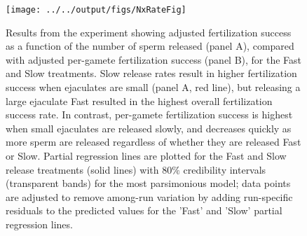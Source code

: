 \documentclass{article}
\begin{document}
\begin{figure}[!ht] 
\centering
\texttt{[image: ../../output/figs/NxRateFig]}
\caption{Results from the  experiment showing adjusted fertilization success as a function of the number of sperm released (panel A), compared with adjusted per-gamete fertilization success (panel B), for the Fast and Slow treatments. Slow release rates result in higher fertilization success when ejaculates are small (panel A, red line), but releasing a large ejaculate Fast resulted in the highest overall fertilization success rate. In contrast, per-gamete fertilization success is highest when small ejaculates are released slowly, and decreases quickly as more sperm are released regardless of whether they are released Fast or Slow. Partial regression lines are plotted for the Fast and Slow release treatments (solid lines) with $80\%$ credibility intervals (transparent bands) for the most parsimonious model; data points are adjusted to remove among-run variation by adding run-specific residuals to the predicted values for the 'Fast' and 'Slow' partial regression lines.}
\label{fig:perGamete}
\end{figure}

\FloatBarrier

\newpage{}






\end{document}
